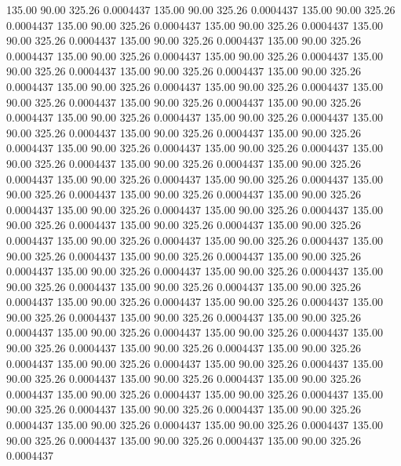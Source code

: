  135.00   90.00  325.26   0.0004437
 135.00   90.00  325.26   0.0004437
 135.00   90.00  325.26   0.0004437
 135.00   90.00  325.26   0.0004437
 135.00   90.00  325.26   0.0004437
 135.00   90.00  325.26   0.0004437
 135.00   90.00  325.26   0.0004437
 135.00   90.00  325.26   0.0004437
 135.00   90.00  325.26   0.0004437
 135.00   90.00  325.26   0.0004437
 135.00   90.00  325.26   0.0004437
 135.00   90.00  325.26   0.0004437
 135.00   90.00  325.26   0.0004437
 135.00   90.00  325.26   0.0004437
 135.00   90.00  325.26   0.0004437
 135.00   90.00  325.26   0.0004437
 135.00   90.00  325.26   0.0004437
 135.00   90.00  325.26   0.0004437
 135.00   90.00  325.26   0.0004437
 135.00   90.00  325.26   0.0004437
 135.00   90.00  325.26   0.0004437
 135.00   90.00  325.26   0.0004437
 135.00   90.00  325.26   0.0004437
 135.00   90.00  325.26   0.0004437
 135.00   90.00  325.26   0.0004437
 135.00   90.00  325.26   0.0004437
 135.00   90.00  325.26   0.0004437
 135.00   90.00  325.26   0.0004437
 135.00   90.00  325.26   0.0004437
 135.00   90.00  325.26   0.0004437
 135.00   90.00  325.26   0.0004437
 135.00   90.00  325.26   0.0004437
 135.00   90.00  325.26   0.0004437
 135.00   90.00  325.26   0.0004437
 135.00   90.00  325.26   0.0004437
 135.00   90.00  325.26   0.0004437
 135.00   90.00  325.26   0.0004437
 135.00   90.00  325.26   0.0004437
 135.00   90.00  325.26   0.0004437
 135.00   90.00  325.26   0.0004437
 135.00   90.00  325.26   0.0004437
 135.00   90.00  325.26   0.0004437
 135.00   90.00  325.26   0.0004437
 135.00   90.00  325.26   0.0004437
 135.00   90.00  325.26   0.0004437
 135.00   90.00  325.26   0.0004437
 135.00   90.00  325.26   0.0004437
 135.00   90.00  325.26   0.0004437
 135.00   90.00  325.26   0.0004437
 135.00   90.00  325.26   0.0004437
 135.00   90.00  325.26   0.0004437
 135.00   90.00  325.26   0.0004437
 135.00   90.00  325.26   0.0004437
 135.00   90.00  325.26   0.0004437
 135.00   90.00  325.26   0.0004437
 135.00   90.00  325.26   0.0004437
 135.00   90.00  325.26   0.0004437
 135.00   90.00  325.26   0.0004437
 135.00   90.00  325.26   0.0004437
 135.00   90.00  325.26   0.0004437
 135.00   90.00  325.26   0.0004437
 135.00   90.00  325.26   0.0004437
 135.00   90.00  325.26   0.0004437
 135.00   90.00  325.26   0.0004437
 135.00   90.00  325.26   0.0004437
 135.00   90.00  325.26   0.0004437
 135.00   90.00  325.26   0.0004437
 135.00   90.00  325.26   0.0004437
 135.00   90.00  325.26   0.0004437
 135.00   90.00  325.26   0.0004437
 135.00   90.00  325.26   0.0004437
 135.00   90.00  325.26   0.0004437
 135.00   90.00  325.26   0.0004437
